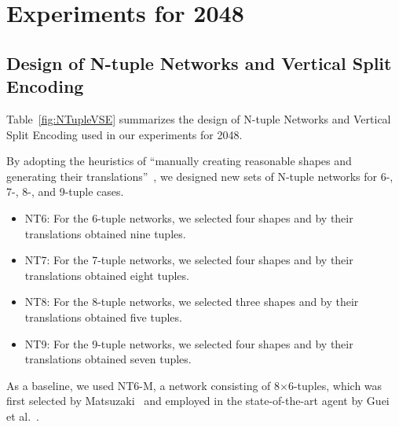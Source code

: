 \section{Experiments for 2048}

\subsection{Design of N-tuple Networks and Vertical Split Encoding}


Table~\ref{fig:NTupleVSE} summarizes the design of N-tuple Networks and Vertical Split Encoding
used in our experiments for 2048.

By adopting the heuristics of ``manually creating reasonable shapes and generating their translations''~\cite{Jask17}, we designed new sets of N-tuple networks for 6-, 7-, 8-, and 9-tuple cases.
\begin{itemize}
\item NT6: For the 6-tuple networks, we selected four shapes and by their translations obtained nine tuples.
\item NT7: For the 7-tuple networks, we selected four shapes and by their translations obtained eight tuples.
\item NT8: For the 8-tuple networks, we selected three shapes and by their translations obtained five tuples.
\item NT9: For the 9-tuple networks, we selected four shapes and by their translations obtained seven tuples.
\end{itemize}
As a baseline, we used NT6-M, a network consisting of 8$\times$6-tuples, which was first selected by Matsuzaki~\cite{Mats16} and employed in the state-of-the-art agent by Guei et al.~\cite{Guei22}.

